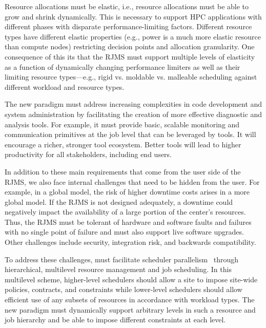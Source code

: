 Resource allocations
must be elastic, i.e., resource allocations must be able to grow and shrink
dynamically. This is necessary to support HPC applications with different
phases with disparate performance-limiting factors.
Different resource types have different
elastic properties 
(e.g., power is a much more elastic resource than compute nodes)
restricting decision points and allocation granularity.
One consequence of this its that the RJMS must 
support multiple levels of elasticity~\cite{Convergence} 
as a function of dynamically changing performance limiters
as well as their limiting resource types---e.g., 
rigid vs. moldable vs. malleable scheduling 
against different workload and resource types.

The new paradigm must address increasing complexities
in code development and system administration by facilitating
the creation of more effective diagnostic and analysis tools.
For example, it must provide basic, scalable monitoring and communication
primitives at the job level that can be leveraged by tools.
It will encourage a richer, stronger tool ecosystem.
Better tools will lead to higher productivity for all
stakeholders, including end users.

In addition to these main requirements that come from the user side
of the RJMS, we also face internal challenges that need to be hidden
from the user. 
For example, in a global model,
the risk of higher downtime costs arises in a more global model.
If the RJMS is not designed adequately, a downtime could negatively
impact the availability of a large portion of the center's
resources. Thus, the RJMS must be tolerant of hardware and software
faults and failures with no single point of failure and must
also support live software upgrades. 
Other challenges include security, integration risk, 
and backwards compatibility. 

%

To address these challenges, %
must facilitate scheduler
parallelism~\cite{Omega,Mesos} through hierarchical,
multilevel resource management and job scheduling.
In this multilevel scheme, higher-level schedulers
should allow a site to impose site-wide policies, contracts,
and constraints while lower-level schedulers should allow
efficient use of any subsets of resources in accordance with
workload types.
The new paradigm must dynamically support arbitrary levels in
such a resource and job hierarchy and be able to impose
different constraints at each level.


